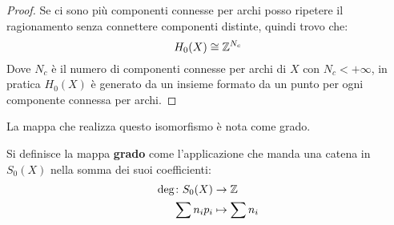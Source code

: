 \begin{proof}
  Se ci sono più componenti connesse per archi posso ripetere il ragionamento senza connettere componenti
  distinte, quindi trovo che:
  \[
    H_0(X) \cong \mathbb{Z}^{N_c}
  \]
  Dove $ N_c $ è il numero di componenti connesse per archi di $ X $ con
  $ N_c < + \infty $, in pratica $ H_0(X) $ è generato da un insieme formato da un
  punto per ogni componente connessa per archi.
\end{proof}
\hfill\newline\newline \noindent
La mappa che realizza questo isomorfismo è nota come grado.
\begin{definition}
  Si definisce la mappa \textbf{grado}  come l'applicazione che manda una catena in $ S_0(X) $ nella somma
  dei suoi coefficienti:
  \begin{align*}
    \deg \colon S_0(X)    & \to  \mathbb{Z} \\
    \sum n_i p_i & \mapsto  \sum n_i
  \end{align*}
\end{definition}

